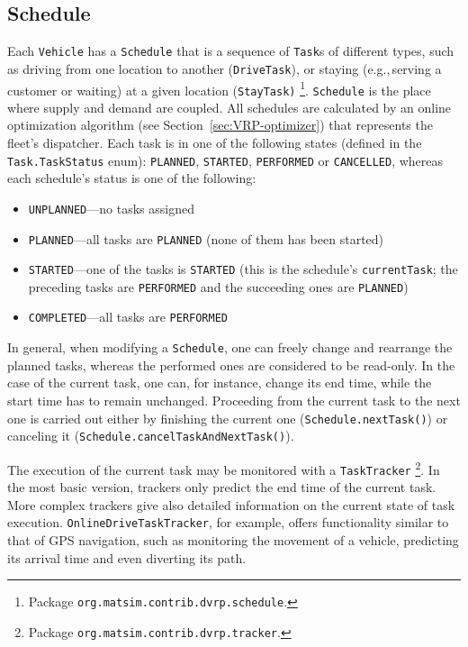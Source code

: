 \subsection{Schedule}
\label{sec:VRP-schedule}
Each \lstinline$Vehicle$ has a \lstinline$Schedule$ that is a sequence of \lstinline$Task$s of different types, such as driving from one location to another (\lstinline$DriveTask$), or staying (e.g.,\,serving a customer or waiting) at a given location (\lstinline$StayTask)$%
\footnote{
Package \lstinline$org.matsim.contrib.dvrp.schedule$.
}. \lstinline$Schedule$ is the place where supply and demand are coupled. All schedules are calculated by an online optimization algorithm (see Section~\ref{sec:VRP-optimizer}) that represents the fleet's dispatcher. Each task is in one of the following states (defined in the \lstinline$Task.TaskStatus$ enum): \lstinline$PLANNED$, \lstinline$STARTED$, \lstinline$PERFORMED$ or \lstinline$CANCELLED$, whereas each schedule's status is one of the following:
%
\begin{itemize}
	\item \lstinline$UNPLANNED$---no tasks assigned
	
	\item \lstinline$PLANNED$---all tasks are \lstinline$PLANNED$ (none of them has been started)
	
	\item \lstinline$STARTED$---one of the tasks is \lstinline$STARTED$ (this is the schedule's \lstinline$currentTask$; the preceding tasks are \lstinline$PERFORMED$ and the succeeding ones are \lstinline$PLANNED$)
	
	\item \lstinline$COMPLETED$---all tasks are \lstinline$PERFORMED$
\end{itemize}
%
In general, when modifying a \lstinline$Schedule$, one can freely change and rearrange the planned tasks, whereas the performed ones are considered to be read-only. In the case of the current task, one can, for instance, change its end time, while the start time has to remain unchanged. Proceeding from the current task to the next one is carried out either by finishing the current one (\lstinline$Schedule.nextTask()$) or canceling it (\lstinline$Schedule.cancelTaskAndNextTask()$).

The execution of the current task may be monitored with a \lstinline$TaskTracker$%
\footnote{
Package \lstinline$org.matsim.contrib.dvrp.tracker$.
}.
In the most basic version, trackers only predict the end time of the current task. More complex trackers give also detailed information on the current state of task execution. \lstinline$OnlineDriveTaskTracker$, for example, offers functionality similar to that of GPS navigation, such as monitoring the movement of a vehicle, predicting its arrival time and even diverting its path.

